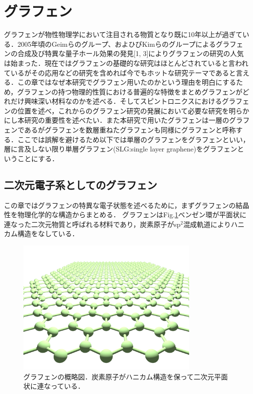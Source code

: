 \section{グラフェン}
グラフェンが物性物理学において注目される物質となり既に10年以上が過ぎている．2005年頃のGeimらのグループ、およひびKimらのグループによるグラフェンの合成及び特異な量子ホール効果の発見[1, 3]によりグラフェンの研究の人気は始まった．現在ではグラフェンの基礎的な研究はほとんどされていると言われているがその応用などの研究を含めれば今でもホットな研究テーマであると言える．この章ではなぜ本研究でグラフェン用いたのかという理由を明白にするため，グラフェンの持つ物理的性質における普遍的な特徴をまとめグラフェンがどれだけ興味深い材料なのかを述べる．そしてスピントロニクスにおけるグラフェンの位置を述べ，これからのグラフェン研究の発展において必要な研究を明らかにし本研究の重要性を述べたい．また本研究で用いたグラフェンは一層のグラフェンであるがグラフェンを数層重ねたグラフェンも同様にグラフェンと呼称する．ここでは誤解を避けるため以下では単層のグラフェンをグラフェンといい，層に言及しない限り単層グラフェン(SLG:single layer graphene)をグラフェンということにする．

\subsection{二次元電子系としてのグラフェン}
この章ではグラフェンの特異な電子状態を述べるために，まずグラフェンの結晶性を物理化学的な構造からまとめる．
グラフェンはFig.\ref{fig:graphene}ベンゼン環が平面状に連なった二次元物質と呼ばれる材料であり，炭素原子がsp$^{2}$混成軌道によりハニカム構造をなしている．
\begin{figure}[t]
 \begin{center}
  \includegraphics[width=90mm]{images/graphene.png}
  \end{center}
   \caption{グラフェンの概略図．炭素原子がハニカム構造を保って二次元平面状に連なっている．}
 \label{fig:graphene}
\end{figure}

